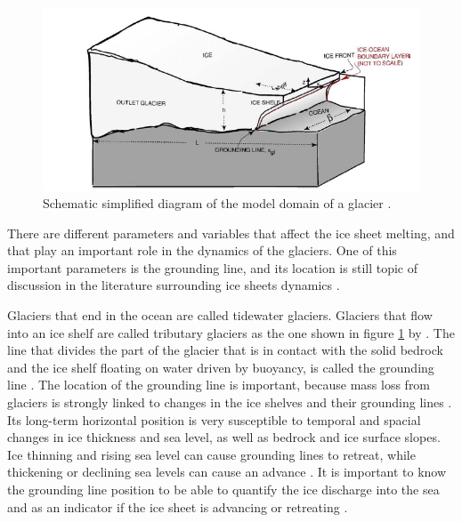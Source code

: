 \documentclass[a4paper,12pt]{article}
\begin{document}
\begin{figure}[!h]
	\centering
	\includegraphics[width=0.7\linewidth]{../fig/Scheme_grounding_line}
	\caption{Schematic simplified diagram of the model domain of a glacier \cite[]{parizek2010implications}.}
	\label{groundingline}
\end{figure}

There are different parameters and variables that affect the ice sheet melting, and that play an important role in the dynamics of the glaciers. One of this important parameters is the grounding line, and its location is still topic of discussion in the literature surrounding ice sheets dynamics \cite[]{goldberg2018representing}.

Glaciers that end in the ocean are called tidewater glaciers. Glaciers that flow into an ice shelf are called tributary glaciers as the one shown in figure \ref{groundingline} by \cite{parizek2010implications}. The line that divides the part of the glacier that is in contact with the solid bedrock and the ice shelf floating on water driven by buoyancy, is called the grounding line \cite[]{cheng2019full}. The location of the grounding line is important, because mass loss from glaciers is strongly linked to changes in the ice shelves and their grounding lines \cite[]{brunt2010mapping,pritchard2012antarctic}. Its long-term horizontal position is very susceptible to temporal and spacial changes in ice thickness and sea level, as well as bedrock and ice surface slopes. Ice thinning and rising sea level can cause grounding lines to retreat, while thickening or declining sea levels can cause an advance \cite[]{friedl2020remote}. It is important to know the grounding line position to be able to quantify the ice discharge into the sea and as an indicator if the ice sheet is advancing or retreating \cite[]{konrad2018net}.
\end{document}
